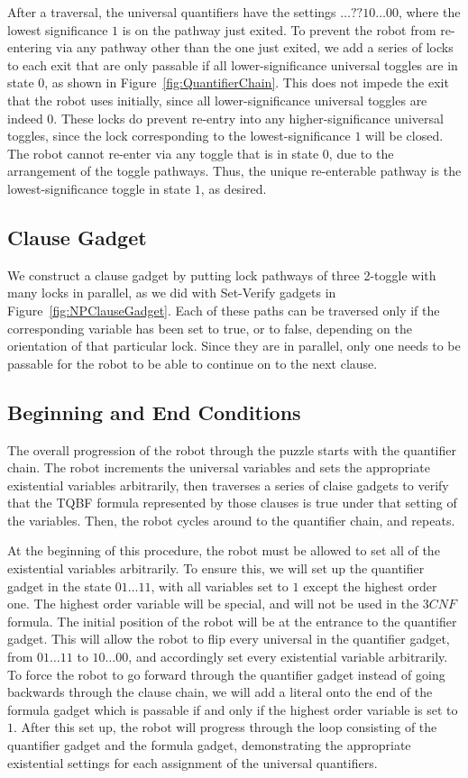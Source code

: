After a traversal, the universal quantifiers have the settings $\ldots??10\ldots00$, where the lowest significance $1$ is 
on the pathway just exited.
To prevent the robot from re-entering via any pathway other than the one just exited, we add a series of locks to each exit that are only passable
if all lower-significance universal toggles are in state $0$, as shown in Figure~\ref{fig:QuantifierChain}.
This does not impede the exit that the robot uses initially, since all
lower-significance universal toggles are indeed $0$. These locks do prevent re-entry into any higher-significance universal toggles, since the
lock corresponding to the lowest-significance $1$ will be closed. The robot cannot re-enter via any toggle that is in state $0$,
due to the arrangement of the toggle pathways. Thus, the unique re-enterable pathway is the lowest-significance toggle in state $1$, as desired.

\subsection{Clause Gadget}
We construct a clause gadget by putting lock pathways of three 2-toggle with many locks in parallel, as we did with Set-Verify gadgets in Figure~\ref{fig:NPClauseGadget}. Each of these paths can be traversed only if the corresponding variable has been set to true, or to false, depending on the orientation of that particular lock. Since they are in parallel, only one needs to be passable for the robot to be able to continue on to the next clause.

\subsection{Beginning and End Conditions}
The overall progression of the robot through the puzzle starts with the quantifier chain.
The robot increments the universal variables and sets the appropriate existential variables arbitrarily, 
then traverses a series of claise gadgets to verify that the TQBF formula represented by those clauses 
is true under that setting of the variables. Then, the robot cycles around to the quantifier chain, and repeats.

At the beginning of this procedure, the robot must be allowed to set all of the existential variables arbitrarily.
To ensure this, we will set up the quantifier gadget in the state $01 \ldots 11$, with all variables set to $1$
except the highest order one.  The highest order variable will be special, and will not be used in the $3CNF$
formula. The initial position of the robot will be at the entrance to the quantifier gadget. This will allow
the robot to flip every universal in the quantifier gadget, from $01 \ldots 11$ to $10 \ldots 00$, and accordingly
set every existential variable arbitrarily. To force the robot to go forward through the quantifier gadget
instead of going backwards through the clause chain, we will add a literal onto the end of the formula gadget
which is passable if and only if the highest order variable is set to $1$.
After this set up, the robot will progress through the loop consisting of the quantifier gadget and the
formula gadget, demonstrating the appropriate existential settings for each assignment of the universal
quantifiers.

